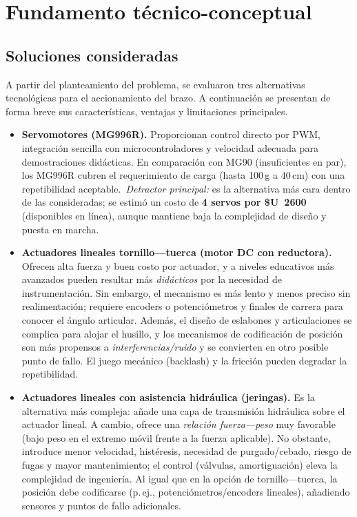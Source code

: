 \section{Fundamento técnico-conceptual}

\subsection{Soluciones consideradas}
A partir del planteamiento del problema, se evaluaron tres alternativas tecnológicas para el accionamiento del brazo. A continuación se presentan de forma breve sus características, ventajas y limitaciones principales.

\begin{itemize}
  \item \textbf{Servomotores (MG996R).} Proporcionan control directo por PWM, integración sencilla con microcontroladores y velocidad adecuada para demostraciones didácticas. En comparación con MG90 (insuficientes en par), los MG996R cubren el requerimiento de carga (hasta 100\,g a 40\,cm) con una repetibilidad aceptable.\ \emph{Detractor principal:} es la alternativa más cara dentro de las consideradas; se estimó un costo de \textbf{4 servos por \mbox{\$U~2600}} (disponibles en línea), aunque mantiene baja la complejidad de diseño y puesta en marcha.

  \item \textbf{Actuadores lineales tornillo---tuerca (motor DC con reductora).} Ofrecen alta fuerza y buen costo por actuador, y a niveles educativos más avanzados pueden resultar más \emph{didácticos} por la necesidad de instrumentación. Sin embargo, el mecanismo es más lento y menos preciso sin realimentación; requiere encoders o potenciómetros y finales de carrera para conocer el ángulo articular. Además, el diseño de eslabones y articulaciones se complica para alojar el husillo, y los mecanismos de codificación de posición son más propensos a \emph{interferencias/ruido} y se convierten en otro posible punto de fallo. El juego mecánico (backlash) y la fricción pueden degradar la repetibilidad.

  \item \textbf{Actuadores lineales con asistencia hidráulica (jeringas).} Es la alternativa más compleja: añade una capa de transmisión hidráulica sobre el actuador lineal. A cambio, ofrece una \emph{relación fuerza---peso} muy favorable (bajo peso en el extremo móvil frente a la fuerza aplicable). No obstante, introduce menor velocidad, histéresis, necesidad de purgado/cebado, riesgo de fugas y mayor mantenimiento; el control (válvulas, amortiguación) eleva la complejidad de ingeniería. Al igual que en la opción de tornillo---tuerca, la posición debe codificarse (p.\,ej., potenciómetros/encoders lineales), añadiendo sensores y puntos de fallo adicionales.
\end{itemize}


